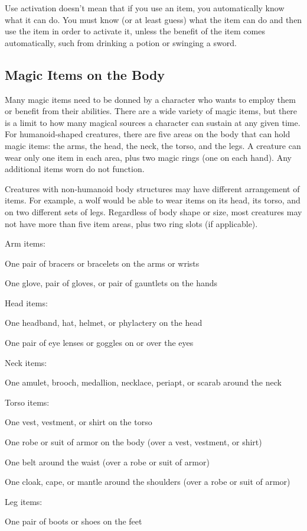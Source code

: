 Use activation doesn't mean that if you use an item, you automatically know what it can do. You must know (or at least guess) what the item can do and then use the item in order to activate it, unless the benefit of the item comes automatically, such from drinking a potion or swinging a sword.

\subsection{Magic Items on the Body}

Many magic items need to be donned by a character who wants to employ them or benefit from their abilities. There are a wide variety of magic items, but there is a limit to how many magical sources a character can sustain at any given time. For humanoid-shaped creatures, there are five areas on the body that can hold magic items: the arms, the head, the neck, the torso, and the legs. A creature can wear only one item in each area, plus two magic rings (one on each hand). Any additional items worn do not function.

Creatures with non-humanoid body structures may have different arrangement of items. For example, a wolf would be able to wear items on its head, its torso, and on two different sets of legs. Regardless of body shape or size, most creatures may not have more than five item areas, plus two ring slots (if applicable).

Arm items:
\begin{itemize*}
\item One pair of bracers or bracelets on the arms or wrists
\item One glove, pair of gloves, or pair of gauntlets on the hands
\end{itemize*}
Head items:
\begin{itemize*}
\item One headband, hat, helmet, or phylactery on the head
\item One pair of eye lenses or goggles on or over the eyes
\end{itemize*}
Neck items:
\begin{itemize*}
\item One amulet, brooch, medallion, necklace, periapt, or scarab around the neck
\end{itemize*}
Torso items:
\begin{itemize*}
\item One vest, vestment, or shirt on the torso
\item One robe or suit of armor on the body (over a vest, vestment, or shirt)
\item One belt around the waist (over a robe or suit of armor)
\item One cloak, cape, or mantle around the shoulders (over a robe or suit of armor)
\end{itemize*}
Leg items:
\begin{itemize*}
\item One pair of boots or shoes on the feet
\end{itemize*}

